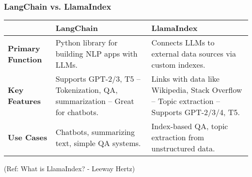 \begin{frame}[fragile]\frametitle{LangChain vs. LlamaIndex}

\begin{tabular}{|p{2cm}|p{4cm}|p{4cm}|}
\hline
\textbf{} & \textbf{LangChain} & \textbf{LlamaIndex} \\
\hline
\textbf{Primary Function} & 
Python library for building NLP apps with LLMs. & 
Connects LLMs to external data sources via custom indexes. \\
\hline
\textbf{Key Features} & 
Supports GPT-2/3, T5 – Tokenization, QA, summarization – Great for chatbots. & 
Links with data like Wikipedia, Stack Overflow – Topic extraction – Supports GPT-2/3/4, T5. \\
\hline
\textbf{Use Cases} & 
Chatbots, summarizing text, simple QA systems. & 
Index-based QA, topic extraction from unstructured data. \\
\hline
\end{tabular}


{\tiny (Ref: What is LlamaIndex? - Leeway Hertz)}

\end{frame}

